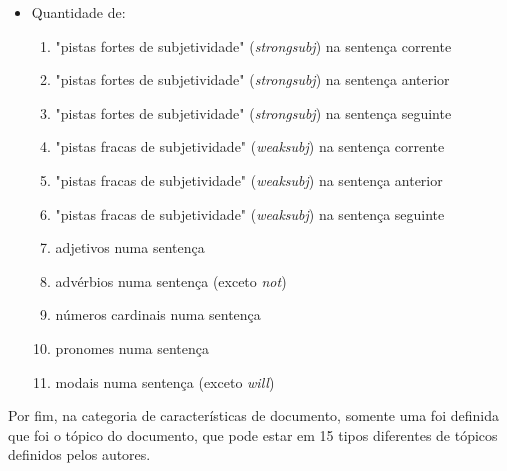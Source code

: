 \documentclass[template.tex]{subfiles}
\begin{document}
\begin{itemize}
\item Quantidade de:
\begin{enumerate}
\item "pistas fortes de subjetividade" (\textit{strongsubj}) na sentença corrente
\item "pistas fortes de subjetividade" (\textit{strongsubj}) na sentença anterior
\item "pistas fortes de subjetividade" (\textit{strongsubj}) na sentença seguinte
\item "pistas fracas de subjetividade" (\textit{weaksubj}) na sentença corrente
\item "pistas fracas de subjetividade" (\textit{weaksubj}) na sentença anterior
\item "pistas fracas de subjetividade" (\textit{weaksubj}) na sentença seguinte
\item adjetivos numa sentença
\item advérbios numa sentença (exceto \textit{not})
\item números cardinais numa sentença
\item pronomes numa sentença
\item modais numa sentença (exceto \textit{will})
\end{enumerate}
\end{itemize}

Por fim, na categoria de características de documento, somente uma foi definida que foi o tópico do documento, que pode estar em 15 tipos diferentes de tópicos definidos pelos autores. 
\end{document}
